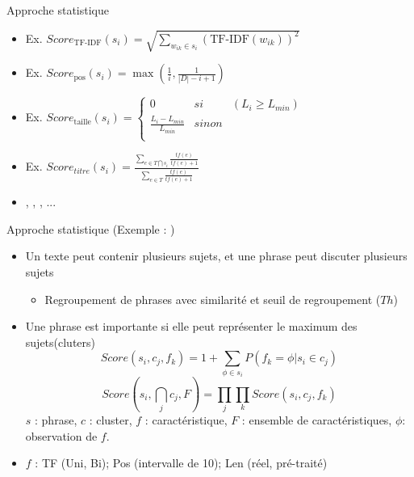 \documentclass{KodeBook}
\begin{document}
Approche statistique

\begin{itemize}
	\item {} 
	
	\hspace{.5cm}Ex. $Score_\text{TF-IDF}(s_i) = \sqrt{\sum\limits_{w_{ik} \in s_i} (\text{TF-IDF}(w_{ik}))^2}$
	
	\item {}
	
	\hspace{.5cm}Ex. $ Score_\text{pos}(s_i) = \max (\frac{1}{i}, \frac{1}{|D| - i + 1}) $
	
	\item {}
	
	\hspace{.5cm}Ex. $ Score_\text{taille}(s_i) = \left\lbrace 
	\begin{array}{lll}
	0 & si & (L_i \geq L_{min}) \\
	\frac{L_i - L_{min}}{L_{min}} & sinon & \\
	\end{array}
	\right. $
	
	\item {}
	
	\hspace{.5cm}Ex. $ Score_{titre}(s_i) = \frac{\sum_{e \in T \bigcap s_i}{\frac{tf(e)}{tf(e)+1}}}
	{\sum_{e \in T}{\frac{tf(e)}{tf(e)+1}}} $
	
	\item {}, , , ...
\end{itemize}

Approche statistique (Exemple : \cite{13-aries-al})


\begin{itemize}
	\item Un texte peut contenir plusieurs sujets, et une phrase peut discuter plusieurs sujets
	\begin{itemize}
		\item Regroupement de phrases avec similarité et seuil de regroupement ($Th$)
	\end{itemize}
	\item Une phrase est importante si elle peut représenter le maximum des sujets(cluters)
	\[ Score(s_i , c_j , f_k ) = 1 + \sum_{\phi \in s_i} {P(f_k=\phi | s_i \in c_j)} \]
	\[ Score(s_i , \bigcap_{j} c_j , F) =  %
	\prod_{j} \prod_{k} Score(s_i , c_j , f_k ) \]
	$ s $ : phrase, $ c $ : cluster, $ f $ : caractéristique, $ F $ : ensemble de caractéristiques, $ \phi $: observation de $ f $.
	\item $f$ : TF (Uni, Bi); Pos (intervalle de 10); Len (réel, pré-traité)
\end{itemize}
\end{document}
